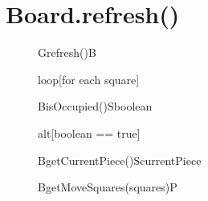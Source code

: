 \documentclass[8pt]{article}
\begin{document}
\section{Board.refresh()}
\begin{figure}[H]
	\centering
  	\begin{adjustbox}{width=\textwidth}
		\begin{sequencediagram}
			      
			\begin{call}{G}{refresh()}{B}{}	
				\begin{sdblock}{loop}{[for each square]}
					\begin{call}{B}{isOccupied()}{S}{boolean}
					\end{call}
					\begin{sdblock}{alt}{[boolean == true]}
						\begin{call}{B}{getCurrentPiece()}{S}{currentPiece}
						\end{call}
						
				  		\begin{messcall}{B}{getMoveSquares(squares)}{P}
						\end{messcall}
				  		
				  		
				  	\end{sdblock}
	    
	    
				\end{sdblock}	
			\end{call}
		
		
		
		\end{sequencediagram}
	\end{adjustbox}
\end{figure}
\end{document}
